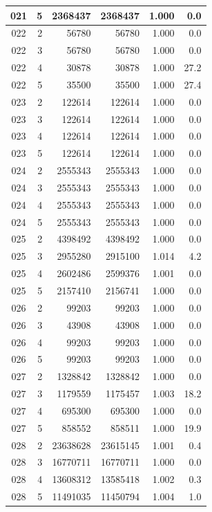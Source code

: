 \begin{longtable}{|c|r|r|r|r|r|}
\hline
021 & 5 & 2368437 & 2368437 & 1.000 & 0.0 \\
\hline
022 & 2 & 56780 & 56780 & 1.000 & 0.0 \\
\hline
022 & 3 & 56780 & 56780 & 1.000 & 0.0 \\
\hline
022 & 4 & 30878 & 30878 & 1.000 & 27.2 \\
\hline
022 & 5 & 35500 & 35500 & 1.000 & 27.4 \\
\hline
023 & 2 & 122614 & 122614 & 1.000 & 0.0 \\
\hline
023 & 3 & 122614 & 122614 & 1.000 & 0.0 \\
\hline
023 & 4 & 122614 & 122614 & 1.000 & 0.0 \\
\hline
023 & 5 & 122614 & 122614 & 1.000 & 0.0 \\
\hline
024 & 2 & 2555343 & 2555343 & 1.000 & 0.0 \\
\hline
024 & 3 & 2555343 & 2555343 & 1.000 & 0.0 \\
\hline
024 & 4 & 2555343 & 2555343 & 1.000 & 0.0 \\
\hline
024 & 5 & 2555343 & 2555343 & 1.000 & 0.0 \\
\hline
025 & 2 & 4398492 & 4398492 & 1.000 & 0.0 \\
\hline
025 & 3 & 2955280 & 2915100 & 1.014 & 4.2 \\
\hline
025 & 4 & 2602486 & 2599376 & 1.001 & 0.0 \\
\hline
025 & 5 & 2157410 & 2156741 & 1.000 & 0.0 \\
\hline
026 & 2 & 99203 & 99203 & 1.000 & 0.0 \\
\hline
026 & 3 & 43908 & 43908 & 1.000 & 0.0 \\
\hline
026 & 4 & 99203 & 99203 & 1.000 & 0.0 \\
\hline
026 & 5 & 99203 & 99203 & 1.000 & 0.0 \\
\hline
027 & 2 & 1328842 & 1328842 & 1.000 & 0.0 \\
\hline
027 & 3 & 1179559 & 1175457 & 1.003 & 18.2 \\
\hline
027 & 4 & 695300 & 695300 & 1.000 & 0.0 \\
\hline
027 & 5 & 858552 & 858511 & 1.000 & 19.9 \\
\hline
028 & 2 & 23638628 & 23615145 & 1.001 & 0.4 \\
\hline
028 & 3 & 16770711 & 16770711 & 1.000 & 0.0 \\
\hline
028 & 4 & 13608312 & 13585418 & 1.002 & 0.3 \\
\hline
028 & 5 & 11491035 & 11450794 & 1.004 & 1.0 \\

\end{longtable}
